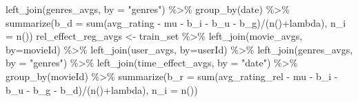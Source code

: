 \documentclass[
]{article}
\newenvironment{Shaded}{}{}
\newcommand{\AttributeTok}[1]{\textcolor[rgb]{0.49,0.56,0.16}{#1}}
\newcommand{\FunctionTok}[1]{\textcolor[rgb]{0.02,0.16,0.49}{#1}}
\newcommand{\NormalTok}[1]{#1}
\newcommand{\OtherTok}[1]{\textcolor[rgb]{0.00,0.44,0.13}{#1}}
\newcommand{\SpecialCharTok}[1]{\textcolor[rgb]{0.25,0.44,0.63}{#1}}
\newcommand{\StringTok}[1]{\textcolor[rgb]{0.25,0.44,0.63}{#1}}
\begin{document}
\begin{Shaded}
\begin{Highlighting}[]
  \FunctionTok{left\_join}\NormalTok{(genres\_avgs, }\AttributeTok{by =} \StringTok{"genres"}\NormalTok{) }\SpecialCharTok{\%\textgreater{}\%} 
    \FunctionTok{group\_by}\NormalTok{(date) }\SpecialCharTok{\%\textgreater{}\%} 
    \FunctionTok{summarize}\NormalTok{(}\AttributeTok{b\_d =} \FunctionTok{sum}\NormalTok{(avg\_rating }\SpecialCharTok{{-}}\NormalTok{ mu }\SpecialCharTok{{-}}\NormalTok{ b\_i }\SpecialCharTok{{-}}\NormalTok{ b\_u }\SpecialCharTok{{-}}\NormalTok{ b\_g)}\SpecialCharTok{/}\NormalTok{(}\FunctionTok{n}\NormalTok{()}\SpecialCharTok{+}\NormalTok{lambda), }\AttributeTok{n\_i =} \FunctionTok{n}\NormalTok{())}
\NormalTok{rel\_effect\_reg\_avgs }\OtherTok{\textless{}{-}}\NormalTok{ train\_set }\SpecialCharTok{\%\textgreater{}\%}
  \FunctionTok{left\_join}\NormalTok{(movie\_avgs, }\AttributeTok{by=}\StringTok{\textquotesingle{}movieId\textquotesingle{}}\NormalTok{) }\SpecialCharTok{\%\textgreater{}\%}
  \FunctionTok{left\_join}\NormalTok{(user\_avgs, }\AttributeTok{by=}\StringTok{\textquotesingle{}userId\textquotesingle{}}\NormalTok{) }\SpecialCharTok{\%\textgreater{}\%} 
  \FunctionTok{left\_join}\NormalTok{(genres\_avgs, }\AttributeTok{by =} \StringTok{"genres"}\NormalTok{) }\SpecialCharTok{\%\textgreater{}\%} 
  \FunctionTok{left\_join}\NormalTok{(time\_effect\_avgs, }\AttributeTok{by =} \StringTok{"date"}\NormalTok{) }\SpecialCharTok{\%\textgreater{}\%} 
  \FunctionTok{group\_by}\NormalTok{(movieId) }\SpecialCharTok{\%\textgreater{}\%} 
  \FunctionTok{summarize}\NormalTok{(}\AttributeTok{b\_r =} \FunctionTok{sum}\NormalTok{(avg\_rating\_rel }\SpecialCharTok{{-}}\NormalTok{ mu }\SpecialCharTok{{-}}\NormalTok{ b\_i }\SpecialCharTok{{-}}\NormalTok{ b\_u }\SpecialCharTok{{-}}\NormalTok{ b\_g }\SpecialCharTok{{-}}\NormalTok{ b\_d)}\SpecialCharTok{/}\NormalTok{(}\FunctionTok{n}\NormalTok{()}\SpecialCharTok{+}\NormalTok{lambda), }\AttributeTok{n\_i =} \FunctionTok{n}\NormalTok{())}


\end{Highlighting}
\end{Shaded}
\end{document}

